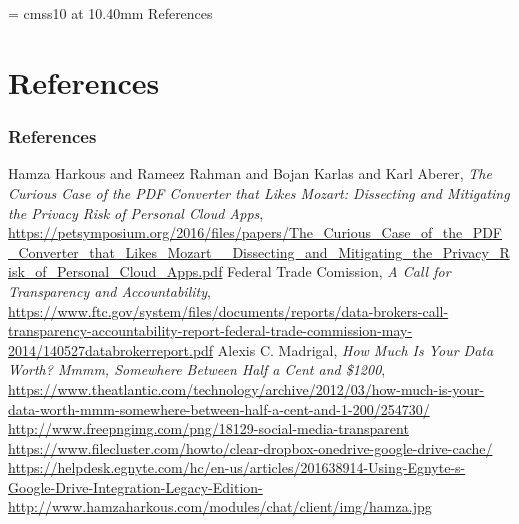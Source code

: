 \documentclass{beamer}
\begin{document}
\appendix

{
\section*{}
	\begin{frame}
      \begin{center}
        \font\endfont = cmss10 at 10.40mm
        \color{darkBlue}
        \endfont 
        \baselineskip 20.0mm
        References
      \end{center}    
\end{frame}
}

\section{References}
\begin{frame}[allowframebreaks]
\frametitle{References}
\small{
\begin{thebibliography}{99} 
  Hamza Harkous and Rameez Rahman and Bojan Karlas and Karl Aberer, \emph{The Curious Case of the PDF Converter that Likes Mozart: Dissecting and Mitigating the Privacy Risk of Personal Cloud Apps}, \url{https://petsymposium.org/2016/files/papers/The\_Curious\_Case\_of\_the\_PDF\_Converter\_that\_Likes\_Mozart\_\_Dissecting\_and\_Mitigating\_the\_Privacy\_Risk\_of\_Personal\_Cloud\_Apps.pdf}
  Federal Trade Comission, \emph{A Call for Transparency and Accountability}, \url{https://www.ftc.gov/system/files/documents/reports/data-brokers-call-transparency-accountability-report-federal-trade-commission-may-2014/140527databrokerreport.pdf}
  Alexis C. Madrigal, \emph{How Much Is Your Data Worth? Mmmm, Somewhere Between Half a Cent and \$1200}, \url{https://www.theatlantic.com/technology/archive/2012/03/how-much-is-your-data-worth-mmm-somewhere-between-half-a-cent-and-1-200/254730/}
  \url{http://www.freepngimg.com/png/18129-social-media-transparent}
  \url{https://www.filecluster.com/howto/clear-dropbox-onedrive-google-drive-cache/}
  \url{https://helpdesk.egnyte.com/hc/en-us/articles/201638914-Using-Egnyte-s-Google-Drive-Integration-Legacy-Edition-}
  \url{http://www.hamzaharkous.com/modules/chat/client/img/hamza.jpg}
\end{thebibliography}
}
\end{frame}
\end{document}
